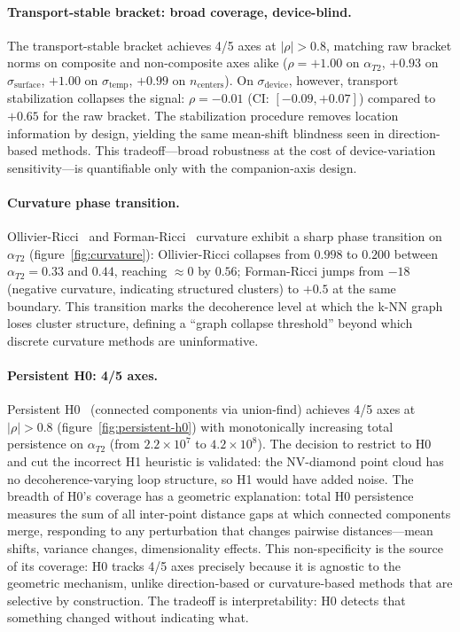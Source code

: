 \documentclass[11pt]{article}
\begin{document}
\paragraph{Transport-stable bracket: broad coverage, device-blind.}
The transport-stable bracket achieves 4/5 axes at $|\rho| > 0.8$,
matching raw bracket norms on composite and non-composite axes alike
($\rho = +1.00$ on $\alpha_{T2}$, $+0.93$ on $\sigma_\text{surface}$,
$+1.00$ on $\sigma_\text{temp}$, $+0.99$ on $n_\text{centers}$).  On
$\sigma_\text{device}$, however, transport stabilization collapses the
signal: $\rho = -0.01$ (CI: $[-0.09, +0.07]$) compared to $+0.65$ for
the raw bracket.  The stabilization procedure removes location
information by design, yielding the same mean-shift blindness seen in
direction-based methods.  This tradeoff---broad robustness at the cost
of device-variation sensitivity---is quantifiable only with the
companion-axis design.

\paragraph{Curvature phase transition.}
Ollivier-Ricci~\citep{ollivier2009ricci} and
Forman-Ricci~\citep{forman2003bochner} curvature exhibit a sharp phase
transition on $\alpha_{T2}$ (figure~\ref{fig:curvature}): Ollivier-Ricci collapses from $0.998$ to
$0.200$ between $\alpha_{T2} = 0.33$ and $0.44$, reaching $\approx 0$
by $0.56$; Forman-Ricci jumps from $-18$ (negative curvature,
indicating structured clusters) to $+0.5$ at the same boundary.  This
transition marks the decoherence level at which the k-NN graph loses
cluster structure, defining a ``graph collapse threshold'' beyond which
discrete curvature methods are uninformative.

\paragraph{Persistent H0: 4/5 axes.}
Persistent H0~\citep{ghrist2008barcodes} (connected components via
union-find) achieves 4/5 axes at $|\rho| > 0.8$ (figure~\ref{fig:persistent-h0}) with monotonically increasing total persistence on
$\alpha_{T2}$ (from $2.2 \times 10^7$ to $4.2 \times 10^8$).  The
decision to restrict to H0 and cut the incorrect H1 heuristic is
validated: the NV-diamond point cloud has no decoherence-varying loop
structure, so H1 would have added noise.  The breadth of H0's coverage
has a geometric explanation: total H0 persistence measures the sum of
all inter-point distance gaps at which connected components merge,
responding to any perturbation that changes pairwise distances---mean
shifts, variance changes, dimensionality effects.  This non-specificity
is the source of its coverage: H0 tracks 4/5 axes precisely because
it is agnostic to the geometric mechanism, unlike direction-based or
curvature-based methods that are selective by construction.  The
tradeoff is interpretability: H0 detects that something changed
without indicating what.
\end{document}

